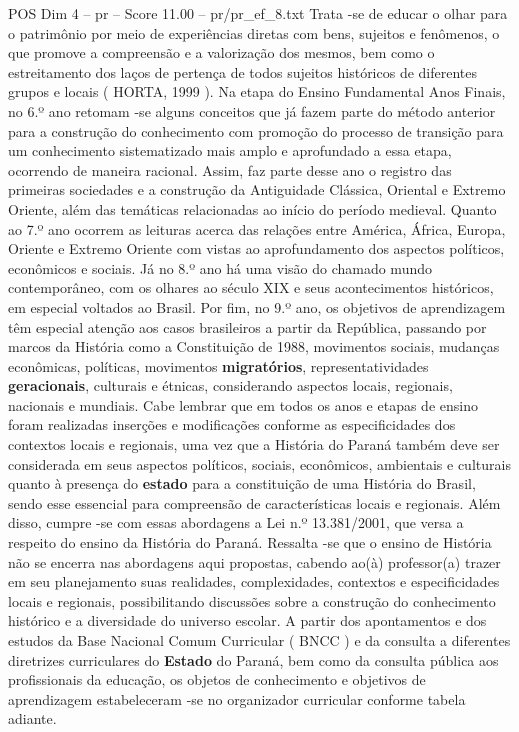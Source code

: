 \begin{textsample}{POS Dim 4 – pr – Score 11.00 – pr/pr\_ef\_8.txt}
Trata -se de educar o olhar para o patrimônio por meio de experiências diretas com bens, sujeitos e fenômenos, o que promove a compreensão e a valorização dos mesmos, bem como o estreitamento dos laços de pertença de todos sujeitos históricos de diferentes grupos e locais ( HORTA, 1999 ).
Na etapa do Ensino Fundamental Anos Finais, no 6.º ano retomam -se alguns conceitos que já fazem parte do método anterior para a construção do conhecimento com promoção do processo de transição para um conhecimento sistematizado mais amplo e aprofundado a essa etapa, ocorrendo de maneira racional.
Assim, faz parte desse ano o registro das primeiras sociedades e a construção da Antiguidade Clássica, Oriental e Extremo Oriente, além das temáticas relacionadas ao início do período medieval.
Quanto ao 7.º ano ocorrem as leituras acerca das relações entre América, África, Europa, Oriente e Extremo Oriente com vistas ao aprofundamento dos aspectos políticos, econômicos e sociais.
Já no 8.º ano há uma visão do chamado mundo contemporâneo, com os olhares ao século XIX e seus acontecimentos históricos, em especial voltados ao Brasil.
Por fim, no 9.º ano, os objetivos de aprendizagem têm especial atenção aos casos brasileiros a partir da República, passando por marcos da História como a Constituição de 1988, movimentos sociais, mudanças econômicas, políticas, movimentos \textbf{migratórios}, representatividades \textbf{geracionais}, culturais e étnicas, considerando aspectos locais, regionais, nacionais e mundiais.
Cabe lembrar que em todos os anos e etapas de ensino foram realizadas inserções e modificações conforme as especificidades dos contextos locais e regionais, uma vez que a História do Paraná também deve ser considerada em seus aspectos políticos, sociais, econômicos, ambientais e culturais quanto à presença do \textbf{estado} para a constituição de uma História do Brasil, sendo esse essencial para compreensão de características locais e regionais.
Além disso, cumpre -se com essas abordagens a Lei n.º 13.381/2001, que versa a respeito do ensino da História do Paraná.
Ressalta -se que o ensino de História não se encerra nas abordagens aqui propostas, cabendo ao(à) professor(a) trazer em seu planejamento suas realidades, complexidades, contextos e especificidades locais e regionais, possibilitando discussões sobre a construção do conhecimento histórico e a diversidade do universo escolar.
A partir dos apontamentos e dos estudos da Base Nacional Comum Curricular ( BNCC ) e da consulta a diferentes diretrizes curriculares do \textbf{Estado} do Paraná, bem como da consulta pública aos profissionais da educação, os objetos de conhecimento e objetivos de aprendizagem estabeleceram -se no organizador curricular conforme tabela adiante.

\end{textsample}
